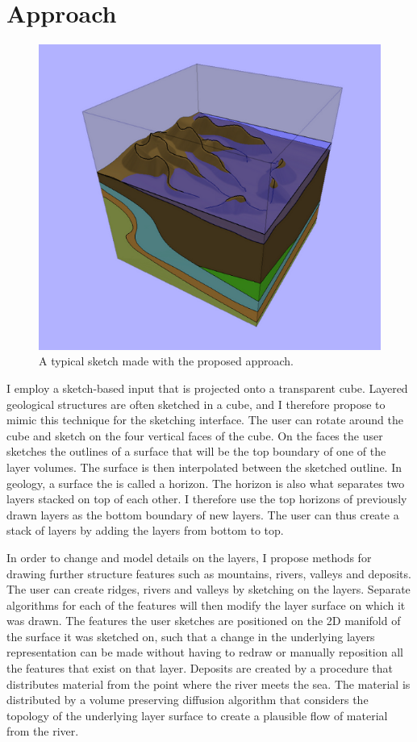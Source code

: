 \documentclass{cescg}[2005/11/12]
\begin{document}
\section{Approach}

\begin{figure}
 \centering
 \includegraphics[width=0.7\linewidth]{approachSketch.png}
 \caption{A typical sketch made with the proposed approach. }
 \label{fig:approachSketch}
\end{figure}

I employ a sketch-based input that is projected onto a transparent cube. Layered geological structures are often sketched in a cube, and I therefore propose to mimic this technique for the sketching interface. The user can rotate around the cube and sketch on the four vertical faces of the cube. On the faces the user sketches the outlines of a surface that will be the top boundary of one of the layer volumes. The surface is then interpolated between the sketched outline. In geology, a surface the is called a horizon. The horizon is also what separates two layers stacked on top of each other. I therefore use the top horizons of previously drawn layers as the bottom boundary of new layers. The user can thus create a stack of layers by adding the layers from bottom to top.

In order to change and model details on the layers, I propose methods for drawing further structure features such as mountains, rivers, valleys and deposits. The user can create ridges, rivers and valleys by sketching on the layers. Separate algorithms for each of the features will then modify the layer surface on which it was drawn. The features the user sketches are positioned on the 2D manifold of the surface it was sketched on, such that a change in the underlying layers representation can be made without having to redraw or manually reposition all the features that exist on that layer. Deposits are created by a procedure that distributes material from the point where the river meets the sea. The material is distributed by a volume preserving diffusion algorithm that considers the topology of the underlying layer surface to create a plausible flow of material from the river.
\end{document}
